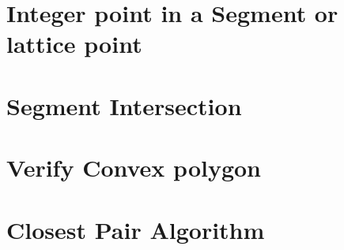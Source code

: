 \documentclass[11pt]{report}
\begin{document}
\section{Integer point in a Segment or lattice point}

\section{Segment Intersection}

\section{Verify Convex polygon}

\section{Closest Pair Algorithm}

\end{document}
